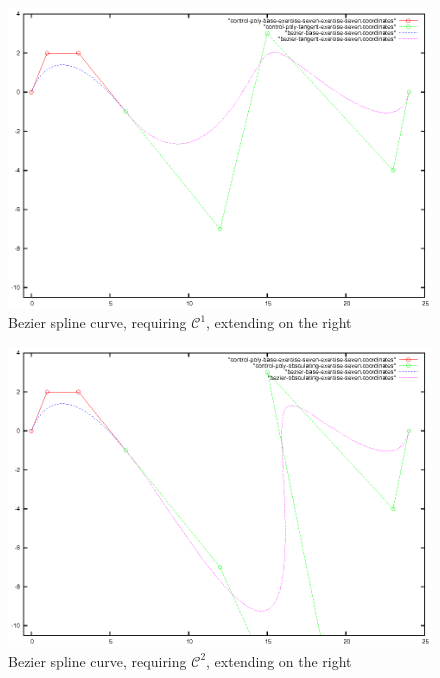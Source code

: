 \documentclass{article}
\begin{document}
\begin{figure}[h!]
  \centering
  \includegraphics{bezier-deCasteljau-curves/exercise-seven-tangent}
  \caption{Bezier spline curve, requiring $\mathcal{C}^1$, extending on the right}
  \label{fig:increasing-degree-does-change-curve}
\end{figure}

\begin{figure}[h!]
  \centering
  \includegraphics{bezier-deCasteljau-curves/exercise-seven-obsculating}
  \caption{Bezier spline curve, requiring $\mathcal{C}^2$, extending on the right}
  \label{fig:increasing-degree-does-change-curve}
\end{figure}

\end{document}
